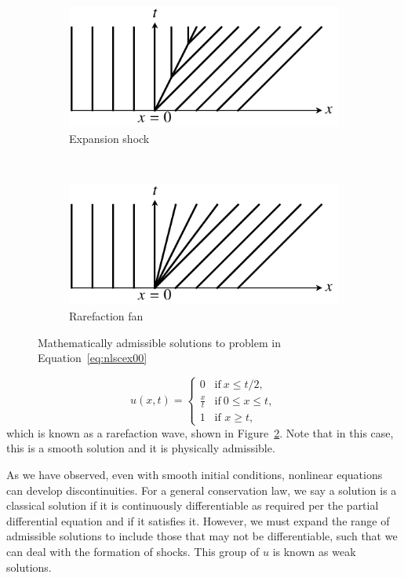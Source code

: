 \begin{figure}[htbp]
	\centering
	\begin{subfigure}[b]{0.4\linewidth}
		\includegraphics[width=\linewidth]{Pictures/nonlinear_scalar_entropycond_1}
	\caption{Expansion shock}
	\label{fig:expansionshock}
	\end{subfigure}
	~
	\begin{subfigure}[b]{0.4\linewidth}
		\includegraphics[width=\linewidth]{Pictures/nonlinear_scalar_entropycond_2}
		\caption{Rarefaction fan}
	\label{fig:rarefactionfan}
	\end{subfigure}
	\caption{Mathematically admissible solutions to problem in Equation~\ref{eq:nlscex00}}
	\label{fig:entropycond}
\end{figure}
\begin{equation}
	u(x,t) = 
	\begin{cases}
		0 & \text{if}~x \leq t/2,\\
		\frac{x}{t} & \text{if}~0 \leq x \leq t, \\
		1 & \text{if } x \geq t,
	\end{cases}
	\label{eq:nlscsol1}
\end{equation}
which is known as a rarefaction wave, shown in Figure~\ref{fig:rarefactionfan}. Note that in this case, this is a smooth solution and it is physically admissible. 

As we have observed, even with smooth initial conditions, nonlinear equations can develop discontinuities. For a general conservation law, we say a solution is a classical solution if it is continuously differentiable as required per the partial differential equation and if it satisfies it. However, we must expand the range of admissible solutions to include those that may not be differentiable, such that we can deal with the formation of shocks. This group of $u$ is known as weak solutions. 

